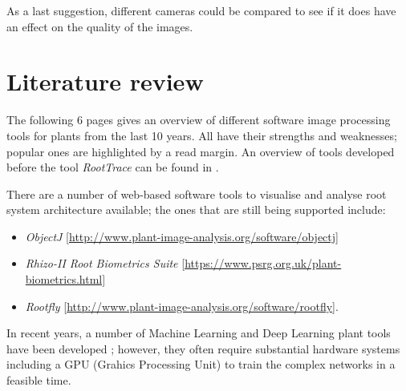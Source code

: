 As a last suggestion, different cameras could be compared to see if it does have an effect on the quality of the images. 



\chapter{Literature review}\label{litreview}

The following 6 pages gives an overview of different software image processing tools for plants from the last 10 years. All have their strengths and weaknesses; popular ones are highlighted by a read margin. An overview of tools developed before the tool \textit{RootTrace} can be found in \cite{french2009high}.





There are a number of web-based software tools to visualise and analyse root system architecture available; the ones that are still being supported include:
\begin{itemize}
	\item \textit{ObjectJ} [\url{http://www.plant-image-analysis.org/software/objectj}]
	\item \textit{Rhizo-II Root Biometrics Suite} \url{[https://www.psrg.org.uk/plant-biometrics.html]}
	\item \textit{Rootfly} [\url{http://www.plant-image-analysis.org/software/rootfly}].
\end{itemize}

In recent years, a number of Machine Learning and Deep Learning plant tools have been developed \cite{pound2017deep,lee2018automated,navarro2016machine}; however, they often require substantial hardware systems including a GPU (Grahics Processing Unit) to train the complex networks in a feasible time.
